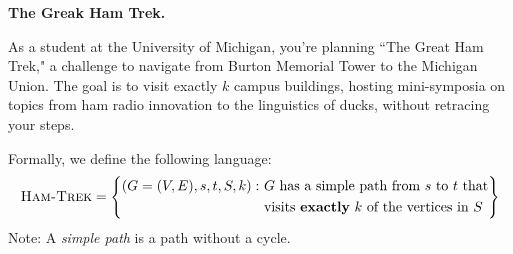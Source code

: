 \documentclass[11pt,addpoints,answers]{exam}
\newcommand{\NP}{\textsf{NP}}
\newcommand{\HamTrek}{\textsc{Ham-Trek}}
\begin{document}
\begin{questions}
    \question \textbf{The Greak Ham Trek.}
    
    As a student at the University of Michigan, you're planning ``The Great Ham Trek," a challenge to navigate from Burton Memorial Tower to the Michigan Union. The goal is to visit exactly $k$ campus buildings, hosting mini-symposia on topics from ham radio innovation to the linguistics of ducks, without retracing your steps.

    Formally, we define the following language:
    \[
        \HamTrek = \left\{
        \begin{aligned}
        (G=(V,E),s,t,S,k) :~ &\text{$G$ has a simple path from $s$ to $t$ that}\\
        &\text{visits \textbf{exactly} $k$ of the vertices in $S$}
        \end{aligned}
        \right\}
    \]
    Note: A \textit{simple path} is a path without a cycle.

\end{questions}
\end{document}

